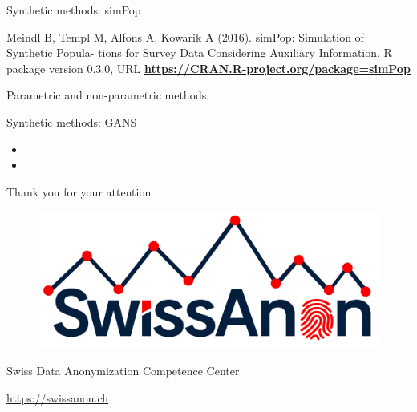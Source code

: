 \documentclass[
	aspectratio = 169
 ]{beamer}
\begin{document}
\begin{frame}{Synthetic methods: simPop}

Meindl B, Templ M, Alfons A, Kowarik A (2016). simPop: Simulation of
Synthetic Popula- tions for Survey Data Considering Auxiliary
Information. R package version 0.3.0, URL
\href{https://CRAN.R-project.org/package=simPop}{\color{blue}\underline{\textbf{https://CRAN.R-project.org/package=simPop}}}

Parametric and non-parametric methods.
\end{frame}

\begin{frame}{Synthetic methods: GANS}

\begin{itemize}
\item
  \color{red}{Generating synthetic data with GANs}
\item
  \Huge \color{red}{for Marco}
\end{itemize}
\end{frame}

\begin{frame}[plain]

\centering
\Huge Thank you for your attention\\

  \vspace{2em}

  \begin{figure}
      \centering
      \includegraphics[width=0.5\linewidth]{style/SwissAnon.png}
  \end{figure}

\large Swiss Data Anonymization Competence Center

\href{https://swissanon.ch}{\color{blue}\underline{https://swissanon.ch}}
\end{frame}

\end{document}
